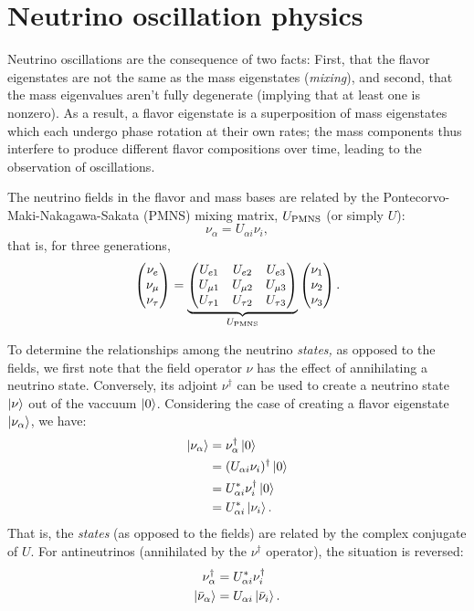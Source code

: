 \documentclass[../thesis.tex]{subfiles}
\begin{document}
\section{Neutrino oscillation physics}
\label{sec:oscPhysics}

Neutrino oscillations are the consequence of two facts: First, that the flavor eigenstates are not the same as the mass eigenstates (\emph{mixing}), and second, that the mass eigenvalues aren't fully degenerate (implying that at least one is nonzero). As a result, a flavor eigenstate is a superposition of mass eigenstates which each undergo phase rotation at their own rates; the mass components thus interfere to produce different flavor compositions over time, leading to the observation of oscillations.

The neutrino fields in the flavor and mass bases are related by the Pontecorvo-Maki-Nakagawa-Sakata (PMNS) mixing matrix, $U_\mathrm{PMNS}$ (or simply $U$):
\begin{equation}
  \nu_\alpha = U_{\alpha i} \nu_i,
\end{equation}
that is, for three generations,
\begin{equation}
  \begin{pmatrix} \nu_e \\ \nu_\mu \\ \nu_\tau \end{pmatrix} = \underbrace{\begin{pmatrix} U_{e 1} & U_{e 2} & U_{e 3} \\ U_{\mu 1} & U_{\mu 2} & U_{\mu 3} \\ U_{\tau 1} & U_{\tau 2} & U_{\tau 3} \end{pmatrix}}_{U_\mathrm{PMNS}} \begin{pmatrix} \nu_1 \\ \nu_2 \\ \nu_3 \end{pmatrix}.
\end{equation}

To determine the relationships among the neutrino \emph{states,} as opposed to the fields, we first note that the field operator $\nu$ has the effect of annihilating a neutrino state. Conversely, its adjoint $\nu^\dagger$ can be used to create a neutrino state $\ket{\nu}$ out of the vaccuum $\ket{0}$. Considering the case of creating a flavor eigenstate $\ket{\nu_\alpha}$, we have:
\begin{equation}
  \label{eq:nuStateRel}
  \begin{aligned}
    \ket{\nu_\alpha} &= \nu_\alpha^\dagger \ket{0} \\
    &= (U_{\alpha i} \nu_i)^\dagger \ket{0} \\
    &= U_{\alpha i}^* \nu_i^\dagger \ket{0} \\
    &= U_{\alpha i}^* \ket{\nu_i}.
  \end{aligned}
\end{equation}
That is, the \emph{states} (as opposed to the fields) are related by the complex conjugate of $U$. For antineutrinos (annihilated by the $\nu^\dagger$ operator), the situation is reversed:
\begin{equation}
  \label{eq:antiNuStateRel}
  \begin{aligned}
    \nu^\dagger_\alpha &= U_{\alpha i}^* \nu^\dagger_i \\
    \ket{\bar\nu_\alpha} &= U_{\alpha i} \ket{\bar\nu_i}.
  \end{aligned}
\end{equation}
\end{document}
